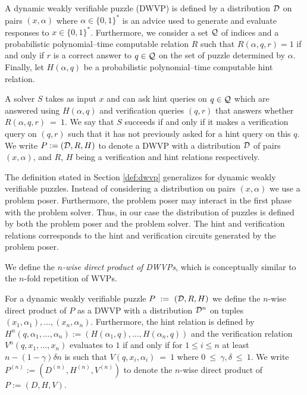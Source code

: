 \begin{definition}
  \label{def:dwvp_dodis}
  A \textnormal{dynamic weakly verifiable puzzle} (DWVP) is defined by a distribution $\mathcal{D}$ on pairs $(x, \alpha)$
  where $\alpha \in \{0,1\}^{*}$ is an advice used to generate and evaluate responses to $x \in \{0,1\}^{*}$.
  Furthermore, we consider a set $\mathcal{Q}$ of indices and a probabilistic polynomial--time computable relation $R$ such that
  $R(\alpha, q, r) = 1$ if and only if $r$ is a correct answer to $q \in \mathcal{Q}$ on the set of puzzle determined by $\alpha$.
  Finally, let $H(\alpha, q)$ be a probabilistic polynomial--time computable \textnormal{hint} relation.

  A solver $S$ takes as input $x$ and can ask hint queries on $q \in \mathcal{Q}$ which are answered using $H(\alpha, q)$ and verification queries $(q,r)$
  that answers whether $R(\alpha,q,r)~=~1$. We say that $S$ succeeds if and only if it makes a verification query on $(q,r)$ such that it
  has not previously asked for a hint query on this $q$. We write $P := (\mathcal{D}, R, H)$ to denote a DWVP with a distribution
  $\mathcal{D}$ of pairs $(x, \alpha)$, and $R$, $H$ being a verification and hint relations respectively.
\end{definition}
%
The definition stated in Section \ref{def:dwvp} generalizes for dynamic weakly verifiable puzzles.
Instead of considering a distribution on pairs $(x,\alpha)$ we use a problem poser.
Furthermore, the problem poser may interact in the first phase with the problem solver.
Thus, in our case the distribution of puzzles is defined by both the problem poser and the problem solver.
The hint and verification relations corresponds to the hint and verification circuits generated by the problem poser.
%

We define the \textit{$n$-wise direct product of DWVPs}, which is conceptually similar to the $n$-fold repetition of WVPs.
%
\begin{definition}
For a dynamic weakly verifiable puzzle $P~:=~(\mathcal{D}, R, H)$ we define the $n$-wise direct product of $P$
as a DWVP with a distribution $\mathcal{D}^n$ on tuples $(x_1, \alpha_1), \dotsc, (x_n, \alpha_n)$.
Furthermore, the hint relation is defined by $H^n(q, \alpha_1, \dotsc, \alpha_n) := (H(\alpha_1, q), \dotsc, H(\alpha_n, q))$ and
the verification relation $V^n(q, x_1, \dotsc, x_n)$ evaluates to $1$ if and only if
for $1 \leq i \leq n$ at least $n - (1 - \gamma)\delta n$ is such that $V(q, x_i,\alpha_i)~=~1$
where $0~\leq~\gamma,\delta~\leq~1$.
%
We write $P^{(n)} := (D^{(n)}, H^{(n)}, V^{(n)})$ to denote the $n$-wise direct product of $P := (D,H,V)$.
%
\end{definition}

